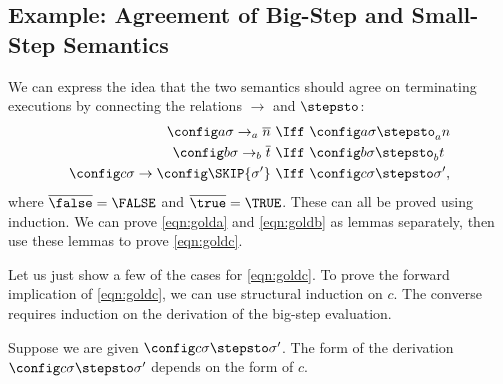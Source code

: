 \iffalse

\subsection{Example: Agreement of Big-Step and Small-Step Semantics}

We can express the idea that the two semantics should
agree on terminating executions by connecting the relations $\rightarrow$ and $\stepsto$:
\begin{align}
\config a\sigma \rightarrow_a \overline n\ &\Iff\ \config a\sigma\stepsto_a n\label{eqn:golda}\\
\config b\sigma \rightarrow_b \overline t\ &\Iff\ \config b\sigma\stepsto_b t\label{eqn:goldb}\\
\config c\sigma \rightarrow \config\SKIP{\sigma'}\ &\Iff\ \config c\sigma\stepsto \sigma',\label{eqn:goldc}
\end{align}
where $\overline\false=\FALSE$ and $\overline\true=\TRUE$.
These can all be proved using induction. We can prove \eqref{eqn:golda} and \eqref{eqn:goldb} as lemmas
separately, then use these lemmas to prove \eqref{eqn:goldc}.

Let us just show a few of the cases for \eqref{eqn:goldc}.
To prove the forward implication of \eqref{eqn:goldc},
we can use structural induction on $c$. The converse requires
induction on the derivation of the big-step evaluation.

Suppose we are given $\config c\sigma\stepsto\sigma'$. The
form of the derivation $\config c\sigma\stepsto\sigma'$ depends on the form of $c$.

